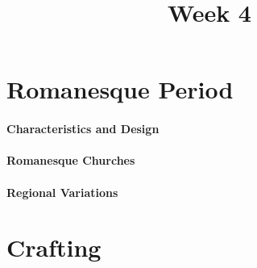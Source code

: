 \documentclass[11pt]{article}
\title{Week 4}
\date{}
\begin{document}
    \maketitle

    \section*{Romanesque Period}
        \paragraph{Characteristics and Design}
        \paragraph{Romanesque Churches}
        \paragraph{Regional Variations}

    \section*{Crafting}
\end{document}
